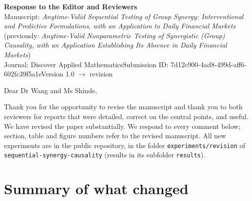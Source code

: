 \documentclass[11pt,a4paper]{article}
\begin{document}
\begin{center}
{\Large\bfseries Response to the Editor and Reviewers}\\[4pt]
Manuscript: \emph{Anytime-Valid Sequential Testing of Group Synergy: Interventional and Predictive Formulations, with an Application to Daily Financial Markets}\\
(previously: \emph{Anytime-Valid Nonparametric Testing of Synergistic (Group) Causality, with an Application Establishing Its Absence in Daily Financial Markets})\\
Journal: Discover Applied Mathematics\quad Submission ID: 7d12c900-4ad8-499d-aff6-602fc39f5a1e\quad Version 1.0 $\rightarrow$ revision
\end{center}

Dear Dr Wang and Ms Shinde,

Thank you for the opportunity to revise the manuscript and thank you to both reviewers for reports that were detailed, correct on the central points, and useful. We have revised the paper substantially. We respond to every comment below; section, table and figure numbers refer to the revised manuscript. All new experiments are in the public repository, in the folder \texttt{experiments/revision} of \texttt{sequential-synergy-causality} (results in its subfolder \texttt{results}).

\section*{Summary of what changed}
\end{document}
